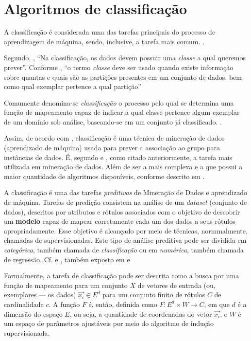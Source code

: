 \section{Algoritmos de classificação}
A classificação é considerada uma das tarefas principais do processo de aprendizagem de máquina, sendo, inclusive, a tarefa mais comum. \cite{amaral_introducao_2018} \cite{fayyad1996}.

Segundo, \cite[p. 86]{amaral_introducao_2018}, ``Na classificação, os dados devem possuir uma \textit{classe} a qual queremos prever''. Conforme \cite{Rocha2012}, ``o termo \textit{classe} deve ser usado quando existe informação sobre quantas e quais são as partições presentes em um conjunto de dados, bem como qual exemplar pertence a qual partição''

Comumente denomina-se \textit{classificação} o processo pelo qual se determina uma função de mapeamento capaz de indicar a qual classe pertence algum exemplar de um domínio sob análise, baseando-se em um conjunto já classificado. \cite{Boscarioli2017}.

Assim, de acordo com \cite{classification2013}, classificação é uma técnica de mineração de dados (aprendizado de máquina) usada para prever a associação ao grupo para instâncias de dados. É, segundo \cite{aprenda_mineracao_fernando_amaral16} e \cite{performance_classification2013}, como citado anteriormente, a tarefa mais utilizada em mineração de dados. Além de ser a mais complexa e a que possui a maior quantidade de algoritmos disponíveis, conforme descrito em \cite{classification2013}.

A classificação é uma das tarefas \textit{preditivas} de Mineração de Dados e aprendizado de máquina. Tarefas de predição consistem na análise de um \textit{dataset} (conjunto de dados), descritos por atributos e rótulos associados com o objetivo de descobrir um \textbf{modelo} capaz de mapear corretamente cada um dos dados a seus rótulos apropriadamente. Esse objetivo é alcançado por meio de técnicas, normmalmente, chamadas de supervisionadas. Este tipo de análise preditiva pode ser dividida em \textit{categórica}, também chamada de \textit{classificação} ou em \textit{numérica}, também chamada de regressão. Cf. \cite{Boscarioli2017}  e \cite{classification2013}, também exposto em \cite{ferrari2017} e \cite{goldschmidt2005}

\underline{Formalmente}, a tarefa de classificação pode ser descrita como a busca por uma função de mapeamento para um conjunto $X$ de vetores de entrada (ou, exemplares --- os dados) $\vec{x_i} \in E^d$ para um conjunto finito de rótulos $C$ de cardinalidade $c$. A função $F$ é, então, definida como $F: E^d \times W \rightarrow C$, em que $d$ é a dimensão do espaço $E$, ou seja, a quantidade de coordenadas do vetor $\vec{x_i}$, e $W$ é um espaço de parâmetros ajustáveis por meio do algoritmo de indução supervisionada. \cite{Boscarioli2017}

